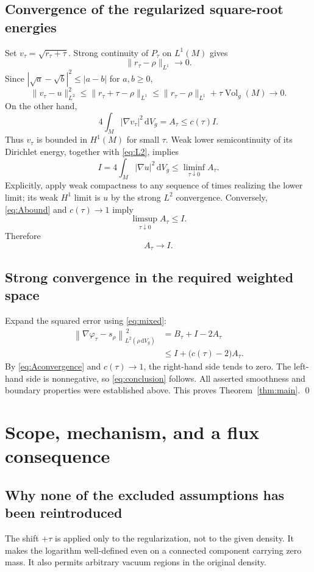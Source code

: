 \documentclass[11pt]{article}
\newcommand{\dd}{\,\mathrm{d}}
\newcommand{\dV}{\dd V_g}
\newcommand{\normrho}[1]{\left\lVert #1\right\rVert_{L^2(\rho\,\mathrm{d}V_g)}}
\begin{document}
\subsection{Convergence of the regularized square-root energies}
Set $v_\tau=\sqrt{r_\tau+\tau}$. Strong continuity of $P_\tau$ on $L^1(M)$ gives
\[
 \|r_\tau-\rho\|_{L^1}\longrightarrow0.
\]
Since $|\sqrt a-\sqrt b|^2\leq|a-b|$ for $a,b\geq0$,
\begin{equation}\label{eq:L2}
 \|v_\tau-u\|_{L^2}^2
 \leq\|r_\tau+\tau-\rho\|_{L^1}
 \leq\|r_\tau-\rho\|_{L^1}+\tau\operatorname{Vol}_g(M)
 \longrightarrow0.
\end{equation}
On the other hand,
\begin{equation}\label{eq:energy}
 4\int_M|\nabla v_\tau|^2\dV=A_\tau\leq c(\tau)I.
\end{equation}
Thus $v_\tau$ is bounded in $H^1(M)$ for small $\tau$. Weak lower semicontinuity of its Dirichlet energy, together with \eqref{eq:L2}, implies
\[
 I=4\int_M|\nabla u|^2\dV\leq\liminf_{\tau\downarrow0}A_\tau.
\]
Explicitly, apply weak compactness to any sequence of times realizing the lower limit; its weak $H^1$ limit is $u$ by the strong $L^2$ convergence. Conversely, \eqref{eq:Abound} and $c(\tau)\to1$ imply
\[
 \limsup_{\tau\downarrow0}A_\tau\leq I.
\]
Therefore
\begin{equation}\label{eq:Aconvergence}
 A_\tau\longrightarrow I.
\end{equation}

\subsection{Strong convergence in the required weighted space}
Expand the squared error using \eqref{eq:mixed}:
\begin{align*}
 \normrho{\nabla\varphi_\tau-s_\rho}^{\,2}
 &=B_\tau+I-2A_\tau\\
 &\leq I+\big(c(\tau)-2\big)A_\tau.
\end{align*}
By \eqref{eq:Aconvergence} and $c(\tau)\to1$, the right-hand side tends to zero. The left-hand side is nonnegative, so \eqref{eq:conclusion} follows. All asserted smoothness and boundary properties were established above. This proves Theorem~\ref{thm:main}. \qed

\section{Scope, mechanism, and a flux consequence}
\subsection{Why none of the excluded assumptions has been reintroduced}
The shift $+\tau$ is applied only to the regularization, not to the given density. It makes the logarithm well-defined even on a connected component carrying zero mass. It also permits arbitrary vacuum regions in the original density.
\end{document}
